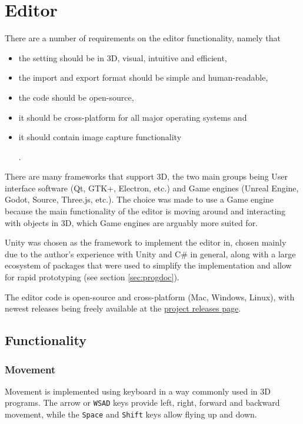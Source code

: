 \chapter{Editor}\label{sec:editor}
There are a number of requirements on the editor functionality, namely that
\begin{itemize}
	\item the setting should be in 3D, visual, intuitive and efficient,
	\item the import and export format should be simple and human-readable,
	\item the code should be open-source,
	\item it should be cross-platform for all major operating systems and
	\item it should contain image capture functionality.
\end{itemize}

There are many frameworks that support 3D, the two main groups being User interface software (Qt, GTK+, Electron, etc.) and Game engines (Unreal Engine, Godot, Source, Three.js, etc.).
The choice was made to use a Game engine because the main functionality of the editor is moving around and interacting with objects in 3D, which Game engines are arguably more suited for.

Unity was chosen as the framework to implement the editor in, chosen mainly due to the author's experience with Unity and C\# in general, along with a large ecosystem of packages that were used to simplify the implementation and allow for rapid prototyping (see section \ref{sec:progdoc}).

The editor code is open-source and cross-platform (Mac, Windows, Linux), with newest releases being freely available at the \href{https://github.com/Climber-Tools/Cled/releases}{project releases page}.

\section{Functionality}

\subsection{Movement}
Movement is implemented using keyboard in a way commonly used in 3D programs.
The arrow or \verb|WSAD| keys provide left, right, forward and backward movement, while the \verb|Space| and \verb|Shift| keys allow flying up and down.


